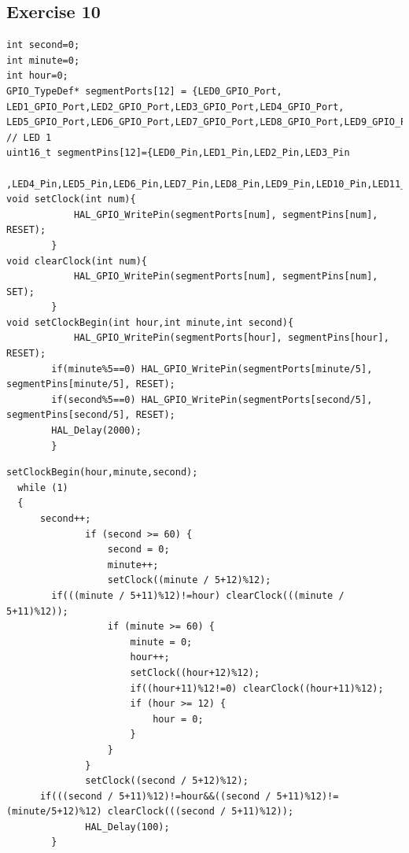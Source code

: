 \subsection{Exercise 10}
\begin{lstlisting}[caption=Ex10.c]
int second=0;
int minute=0;
int hour=0;
GPIO_TypeDef* segmentPorts[12] = {LED0_GPIO_Port, LED1_GPIO_Port,LED2_GPIO_Port,LED3_GPIO_Port,LED4_GPIO_Port,
LED5_GPIO_Port,LED6_GPIO_Port,LED7_GPIO_Port,LED8_GPIO_Port,LED9_GPIO_Port,LED10_GPIO_Port,LED11_GPIO_Port};  // LED 1
uint16_t segmentPins[12]={LED0_Pin,LED1_Pin,LED2_Pin,LED3_Pin
  ,LED4_Pin,LED5_Pin,LED6_Pin,LED7_Pin,LED8_Pin,LED9_Pin,LED10_Pin,LED11_Pin};
void setClock(int num){
        	HAL_GPIO_WritePin(segmentPorts[num], segmentPins[num], RESET);
        }
void clearClock(int num){
        	HAL_GPIO_WritePin(segmentPorts[num], segmentPins[num], SET);
        }
void setClockBegin(int hour,int minute,int second){
        	HAL_GPIO_WritePin(segmentPorts[hour], segmentPins[hour], RESET);
        if(minute%5==0)	HAL_GPIO_WritePin(segmentPorts[minute/5], segmentPins[minute/5], RESET);
        if(second%5==0)	HAL_GPIO_WritePin(segmentPorts[second/5], segmentPins[second/5], RESET);
        HAL_Delay(2000);
        }

\end{lstlisting}
\begin{lstlisting}[caption=main.c]
setClockBegin(hour,minute,second);
  while (1)
  {
	  second++;
	  	      if (second >= 60) {
	  	          second = 0;
	  	          minute++;
	  	          setClock((minute / 5+12)%12);
        if(((minute / 5+11)%12)!=hour) clearClock(((minute / 5+11)%12));
	  	          if (minute >= 60) {
	  	              minute = 0;
	  	              hour++;
	  	              setClock((hour+12)%12);
	  	              if((hour+11)%12!=0) clearClock((hour+11)%12);
	  	              if (hour >= 12) {
	  	                  hour = 0;
	  	              }
	  	          }
	  	      }
	  	      setClock((second / 5+12)%12);
	  if(((second / 5+11)%12)!=hour&&((second / 5+11)%12)!=(minute/5+12)%12) clearClock(((second / 5+11)%12));
	  	      HAL_Delay(100);
        }
\end{lstlisting}
